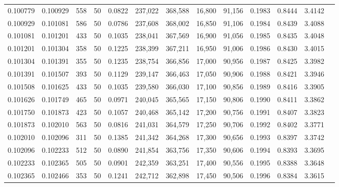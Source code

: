 \begin{tabular}{rrrrrrrrrrrrr}
0.100779 & 0.100929 &   558 &  50 &                                     0.0822 & 237,022 & 368,588 &  16,800 &  91,156 & 0.1983 & 0.8444 & 3.4142 \\
0.100929 & 0.101081 &   586 &  50 &                                     0.0786 & 237,608 & 368,002 &  16,850 &  91,106 & 0.1984 & 0.8439 & 3.4088 \\
0.101081 & 0.101201 &   433 &  50 &                                     0.1035 & 238,041 & 367,569 &  16,900 &  91,056 & 0.1985 & 0.8435 & 3.4048 \\
0.101201 & 0.101304 &   358 &  50 &                                     0.1225 & 238,399 & 367,211 &  16,950 &  91,006 & 0.1986 & 0.8430 & 3.4015 \\
0.101304 & 0.101391 &   355 &  50 &                                     0.1235 & 238,754 & 366,856 &  17,000 &  90,956 & 0.1987 & 0.8425 & 3.3982 \\
0.101391 & 0.101507 &   393 &  50 &                                     0.1129 & 239,147 & 366,463 &  17,050 &  90,906 & 0.1988 & 0.8421 & 3.3946 \\
0.101508 & 0.101625 &   433 &  50 &                                     0.1035 & 239,580 & 366,030 &  17,100 &  90,856 & 0.1989 & 0.8416 & 3.3905 \\
0.101626 & 0.101749 &   465 &  50 &                                     0.0971 & 240,045 & 365,565 &  17,150 &  90,806 & 0.1990 & 0.8411 & 3.3862 \\
0.101750 & 0.101873 &   423 &  50 &                                     0.1057 & 240,468 & 365,142 &  17,200 &  90,756 & 0.1991 & 0.8407 & 3.3823 \\
0.101873 & 0.102010 &   563 &  50 &                                     0.0816 & 241,031 & 364,579 &  17,250 &  90,706 & 0.1992 & 0.8402 & 3.3771 \\
0.102010 & 0.102096 &   311 &  50 &                                     0.1385 & 241,342 & 364,268 &  17,300 &  90,656 & 0.1993 & 0.8397 & 3.3742 \\
0.102096 & 0.102233 &   512 &  50 &                                     0.0890 & 241,854 & 363,756 &  17,350 &  90,606 & 0.1994 & 0.8393 & 3.3695 \\
0.102233 & 0.102365 &   505 &  50 &                                     0.0901 & 242,359 & 363,251 &  17,400 &  90,556 & 0.1995 & 0.8388 & 3.3648 \\
0.102365 & 0.102466 &   353 &  50 &                                     0.1241 & 242,712 & 362,898 &  17,450 &  90,506 & 0.1996 & 0.8384 & 3.3615 \\

\end{tabular}
